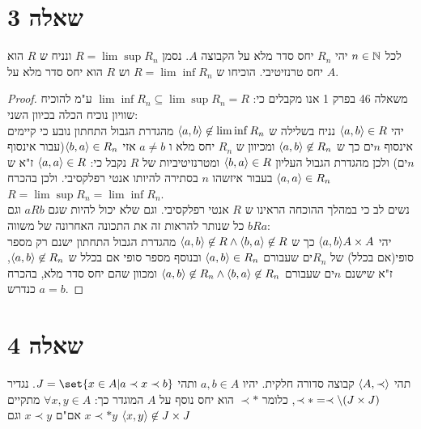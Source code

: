 \documentclass{article}
\DeclarePairedDelimiter\set\{\}
\begin{document}
	\pagebreak
	\section*{שאלה 3}
	לכל $n \in \mathbb{N}$ יהי $R_n$ יחס סדר מלא על הקבוצה $A$. נסמן $R = \lim\sup R_n$ ונניח ש $R$ הוא יחס טרנזיטיבי.
	הוכיחו ש $R = \lim\inf R_n$ וש $R$ הוא יחס סדר מלא על $A$.

	\begin{proof}
		משאלה 46 בפרק 1 אנו מקבלים כי: $\lim \inf R_n \subseteq \lim \sup R_n = R$ ע"מ להוכיח שוויון נוכיח הכלה בכיוון השני: \\
		יהי $\langle a,b \rangle \in R$ נניח בשלילה ש $\langle a,b \rangle \not\in \lim\inf R_n$ מהגדרת הגבול התחתון נובע כי קיימים אינסוף $n$ים כך ש $\langle a,b \rangle \not\in R_n$
		 ומכיוון ש $R_n$ יחס מלא ו $a \neq b$ אזי $\langle b,a \rangle \in R_n$(עבור אינסוף $n$ים) ולכן מהגדרת הגבול העליון $\langle b,a \rangle \in R$ ומטרנזיטיביות של $R$ נקבל כי:
		 $\langle a,a \rangle \in R$ ז"א ש $\langle a,a \rangle \in R_n$ בעבור איזשהו $n$ בסתירה להיותו אנטי רפלקסיבי.
		 ולכן בהכרח $R = \lim \sup R_n = \lim\inf R_n$. \\
		 נשים לב כי במהלך ההוכחה הראינו ש $R$ אנטי רפלקסיבי. וגם שלא יכול להיות שגם $aRb$ וגם $bRa$ כל שנותר להראות זה את התכונה האחרונה של משווה: \\
		 יהי $\langle a,b \rangle A \times A$ כך ש $\langle a,b \rangle \not\in R \land \langle b,a \rangle \not\in R$ מהגדרת הגבול התחתון ישנם רק מספר סופי(אם בכלל) של $R_n$ים שעבורם $\langle a,b \rangle \in R_n$ ובנוסף מספר סופי אם בכלל ש $\langle a,b \rangle \not\in R_n$, ז"א שישנם $n$ים שעבורם $\langle a,b \rangle \not\in R_n \land \langle b,a \rangle \not\in R_n$ ומכוון שהם יחס סדר מלא, בהכרח $a=b$ כנדרש.
	\end{proof}


	\section*{שאלה 4}
	תהי $\langle A, \prec \rangle$ קבוצה סדורה חלקית. יהיו $a, b \in A$ ותהי $J = \set{x \in A | a \prec x \prec b}$.
	נגדיר $\prec\ast = \prec \setminus (J \times J)$, כלומר $\prec\ast$ הוא יחס נוסף על $A$ המוגדר כך:
	$\forall x,y \in A$ מתקיים $x \prec\ast y$ אם"ם $x \prec y$ וגם $\langle x,y \rangle \not\in J \times J$
\end{document}
